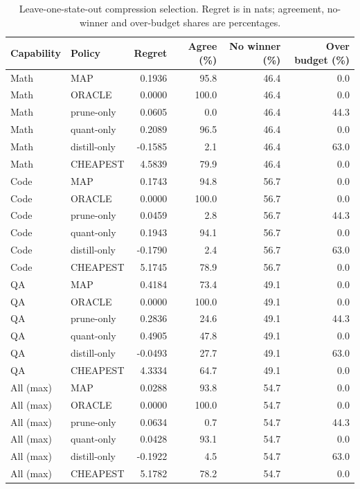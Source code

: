 \begin{table}[tb]
\centering
\footnotesize
\caption{Leave-one-state-out compression selection. Regret is in nats; agreement, no-winner and over-budget shares are percentages.}
\label{tab:selection_maps}
\begin{tabular}{llrrrr}
\hline
Capability & Policy & Regret & Agree (\%) & No winner (\%) & Over budget (\%) \\
\hline
Math & MAP & 0.1936 & 95.8 & 46.4 & 0.0 \\
Math & ORACLE & 0.0000 & 100.0 & 46.4 & 0.0 \\
Math & prune-only & 0.0605 & 0.0 & 46.4 & 44.3 \\
Math & quant-only & 0.2089 & 96.5 & 46.4 & 0.0 \\
Math & distill-only & -0.1585 & 2.1 & 46.4 & 63.0 \\
Math & CHEAPEST & 4.5839 & 79.9 & 46.4 & 0.0 \\
\hline
Code & MAP & 0.1743 & 94.8 & 56.7 & 0.0 \\
Code & ORACLE & 0.0000 & 100.0 & 56.7 & 0.0 \\
Code & prune-only & 0.0459 & 2.8 & 56.7 & 44.3 \\
Code & quant-only & 0.1943 & 94.1 & 56.7 & 0.0 \\
Code & distill-only & -0.1790 & 2.4 & 56.7 & 63.0 \\
Code & CHEAPEST & 5.1745 & 78.9 & 56.7 & 0.0 \\
\hline
QA & MAP & 0.4184 & 73.4 & 49.1 & 0.0 \\
QA & ORACLE & 0.0000 & 100.0 & 49.1 & 0.0 \\
QA & prune-only & 0.2836 & 24.6 & 49.1 & 44.3 \\
QA & quant-only & 0.4905 & 47.8 & 49.1 & 0.0 \\
QA & distill-only & -0.0493 & 27.7 & 49.1 & 63.0 \\
QA & CHEAPEST & 4.3334 & 64.7 & 49.1 & 0.0 \\
\hline
All (max) & MAP & 0.0288 & 93.8 & 54.7 & 0.0 \\
All (max) & ORACLE & 0.0000 & 100.0 & 54.7 & 0.0 \\
All (max) & prune-only & 0.0634 & 0.7 & 54.7 & 44.3 \\
All (max) & quant-only & 0.0428 & 93.1 & 54.7 & 0.0 \\
All (max) & distill-only & -0.1922 & 4.5 & 54.7 & 63.0 \\
All (max) & CHEAPEST & 5.1782 & 78.2 & 54.7 & 0.0 \\

\end{tabular}
\end{table}
